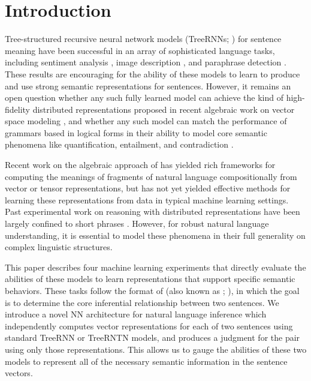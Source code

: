 \section{Introduction}\label{sec:intro}

Tree-structured recursive neural network models (TreeRNNs; \citealt{goller1996learning,socher2011semi}) for sentence meaning
have been successful in an array of sophisticated language tasks,
including sentiment analysis \cite{socher2011semi,irsoydeep},
image description \cite{sochergrounded}, and paraphrase detection
\cite{Socher-etal:2011:Paraphrase}. These results are encouraging for
the ability of these models to learn to produce and use strong 
semantic representations for sentences. However, it remains an 
open question whether any such fully learned model can achieve the kind of
high-fidelity distributed representations proposed in recent algebraic
work on vector space modeling 
\cite{ClarkCoeckeSadrzadeh2011,grefenstette2013towards,Hermann-etal:2013,rocktaschellow},
and whether any such model can match the performance of grammars based in logical forms
in their ability to model core semantic phenomena like quantification, entailment, and contradiction \cite{Warren:Pereira:1982,Zelle:Mooney:1996,ZetCol:2005,LiangJordan:2013}.

Recent work on the algebraic approach of
 has yielded rich frameworks 
for computing the meanings of fragments of natural
language compositionally from vector or tensor representations, but 
has not yet yielded effective methods for learning these representations
from data in typical machine learning settings. 
Past experimental work on reasoning with
distributed representations have been largely confined to short
phrases \cite{Mitchell:Lapata:2010,Grefenstette-etal:2011,baroni2012entailment}.
However, for robust natural language understanding, it is essential to
model these phenomena in their full generality on complex linguistic
structures. 

This paper describes four machine learning experiments
that directly evaluate the abilities of these models to learn representations that 
support specific semantic behaviors. These tasks follow the format of
(also known as ;
\citealt{dagan2006pascal}), in which the goal is to determine the core
inferential relationship between two sentences. 
We introduce a novel NN architecture for natural language inference which
independently computes vector representations for each of two sentences using
standard TreeRNN or TreeRNTN \cite{socher2013acl1} models, and
produces a judgment for the pair using only those representations. This allows
us to gauge the abilities of these two models to represent all of the necessary semantic
information in the sentence vectors. 

